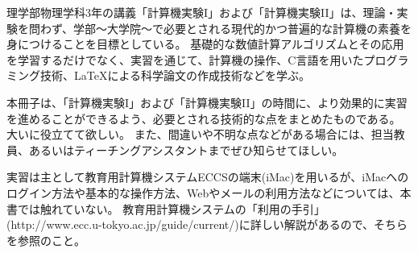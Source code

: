 
理学部物理学科3年の講義「計算機実験I」および「計算機実験II」は、理論・実験を問わず、学部〜大学院〜で必要とされる現代的かつ普遍的な計算機の素養を身につけることを目標としている。
基礎的な数値計算アルゴリズムとその応用を学習するだけでなく、実習を通じて、計算機の操作、C言語を用いたプログラミング技術、\LaTeX による科学論文の作成技術などを学ぶ。

本冊子は、「計算機実験I」および「計算機実験II」の時間に、より効果的に実習を進めることができるよう、必要とされる技術的な点をまとめたものである。
大いに役立てて欲しい。
また、間違いや不明な点などがある場合には、担当教員、あるいはティーチングアシスタントまでぜひ知らせてほしい。

実習は主として教育用計算機システムECCSの端末(iMac)を用いるが、iMacへのログイン方法や基本的な操作方法、Webやメールの利用方法などについては、本書では触れていない。
教育用計算機システムの「利用の手引」(http://www.ecc.u-tokyo.ac.jp/guide/current/)に詳しい解説があるので、そちらを参照のこと。
